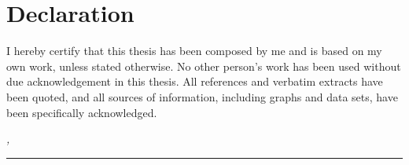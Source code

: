%
\chapter*{Declaration}
\label{sec:declaration}
\thispagestyle{empty}

I hereby certify that this thesis has been composed by me and is based on my own work, unless stated otherwise.
No other person's work has been used without due acknowledgement in this thesis.
All references and verbatim extracts have been quoted, and all sources of information, including graphs and data sets, have been specifically acknowledged.
\bigskip

\noindent\textit{\thesisUniversityCity, \thesisDate}

\smallskip

\begin{flushright}
	\begin{minipage}{5cm}
		\rule{\textwidth}{1pt}
		\centering\thesisName
	\end{minipage}
\end{flushright}

